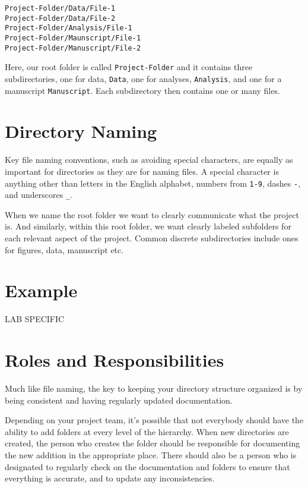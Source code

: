 \documentclass[
]{book}
\begin{document}
\begin{verbatim}
Project-Folder/Data/File-1
Project-Folder/Data/File-2
Project-Folder/Analysis/File-1
Project-Folder/Maunscript/File-1
Project-Folder/Manuscript/File-2
\end{verbatim}

Here, our root folder is called \texttt{Project-Folder} and it contains three subdirectories, one for data, \texttt{Data}, one for analyses, \texttt{Analysis}, and one for a manuscript \texttt{Manuscript}. Each subdirectory then contains one or many files.

\hypertarget{directory-naming}{%
\section*{Directory Naming}\label{directory-naming}}

Key file naming conventions, such as avoiding special characters, are equally as important for directories as they are for naming files. A special character is anything other than letters in the English alphabet, numbers from \texttt{1-9}, dashes \texttt{-}, and underscores \texttt{\_}.

When we name the root folder we want to clearly communicate what the project is. And similarly, within this root folder, we want clearly labeled subfolders for each relevant aspect of the project. Common discrete subdirectories include ones for figures, data, manuscript etc.

\hypertarget{example}{%
\section*{Example}\label{example}}

LAB SPECIFIC

\hypertarget{roles-and-responsibilities-1}{%
\section*{Roles and Responsibilities}\label{roles-and-responsibilities-1}}

Much like file naming, the key to keeping your directory structure organized is by being consistent and having regularly updated documentation.

Depending on your project team, it's possible that not everybody should have the ability to add folders at every level of the hierarchy. When new directories are created, the person who creates the folder should be responsible for documenting the new addition in the appropriate place. There should also be a person who is designated to regularly check on the documentation and folders to ensure that everything is accurate, and to update any inconsistencies.
\end{document}
